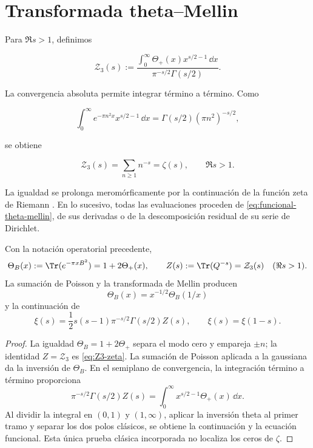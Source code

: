 \section{Transformada theta--Mellin}

Para $\Re s>1$, definimos

\begin{equation}
 \mathcal Z_{3}(s)
 :=
 \frac{\displaystyle
 \int_0^\infty\Theta_+(x)x^{s/2-1}\,\dd x}
 {\pi^{-s/2}\Gamma(s/2)}.
 \label{eq:funcional-theta-mellin}
\end{equation}

La convergencia absoluta permite integrar término a término. Como

\[
 \int_0^\infty e^{-\pi n^2x}x^{s/2-1}\,\dd x
 =\Gamma(s/2)(\pi n^2)^{-s/2},
\]

se obtiene

\begin{equation}
 \mathcal Z_3(s)=\sum_{n\geq1}n^{-s}=\zeta(s),
 \qquad \Re s>1.
 \label{eq:Z3-zeta}
\end{equation}

La igualdad se prolonga meromórficamente por la continuación de la función
zeta de Riemann \cite{Apostol1976}. En lo sucesivo, todas las evaluaciones
proceden de \eqref{eq:funcional-theta-mellin}, de sus derivadas o de la
descomposición residual de su serie de Dirichlet.

\begin{theorem}
\label{pf84:C05}
Con la notación operatorial precedente,
\[
 \Theta_B(x):=\Tr(e^{-\pi xB^2})
 =1+2\Theta_+(x),
 \qquad
 Z(s):=\Tr(Q^{-s})=\mathcal Z_3(s)
 \quad(\Re s>1).
\]
La sumación de Poisson y la transformada de Mellin producen
\[
 \Theta_B(x)=x^{-1/2}\Theta_B(1/x)
\]
y la continuación de
\[
 \xi(s)=\frac12s(s-1)\pi^{-s/2}\Gamma(s/2)Z(s),
 \qquad
 \xi(s)=\xi(1-s).
\]
\end{theorem}

\begin{proof}
La igualdad \(\Theta_B=1+2\Theta_+\) separa el modo cero y empareja
\(\pm n\); la identidad \(Z=\mathcal Z_3\) es
\eqref{eq:Z3-zeta}. La sumación de Poisson aplicada a la gaussiana da la
inversión de \(\Theta_B\). En el semiplano de convergencia, la integración
término a término proporciona
\[
 \pi^{-s/2}\Gamma(s/2)Z(s)
 =\int_0^\infty x^{s/2-1}\Theta_+(x)\,\dd x.
\]
Al dividir la integral en \((0,1)\) y \((1,\infty)\), aplicar la inversión
theta al primer tramo y separar los dos polos clásicos, se obtiene la
continuación y la ecuación funcional. Esta única prueba clásica incorporada
no localiza los ceros de \(\zeta\).
\end{proof}

